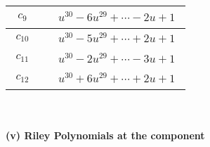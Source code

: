 \documentclass[1p]{elsarticle_modified}
\theoremstyle{definition}
\begin{document}
\begin{tabular}{m{50pt}|m{274pt}}
\hline $$\begin{aligned}c_{9}\end{aligned}$$&$\begin{aligned}
&u^{30}-6 u^{29}+\cdots-2 u+1
\end{aligned}$\\
\hline $$\begin{aligned}c_{10}\end{aligned}$$&$\begin{aligned}
&u^{30}-5 u^{29}+\cdots+2 u+1
\end{aligned}$\\
\hline $$\begin{aligned}c_{11}\end{aligned}$$&$\begin{aligned}
&u^{30}-2 u^{29}+\cdots-3 u+1
\end{aligned}$\\
\hline $$\begin{aligned}c_{12}\end{aligned}$$&$\begin{aligned}
&u^{30}+6 u^{29}+\cdots+2 u+1
\end{aligned}$\\
\hline
\end{tabular}\\~\\
\newpage\renewcommand{\arraystretch}{1}
\flushleft \textbf{(v) Riley Polynomials at the component}\newline \\
\end{document}
